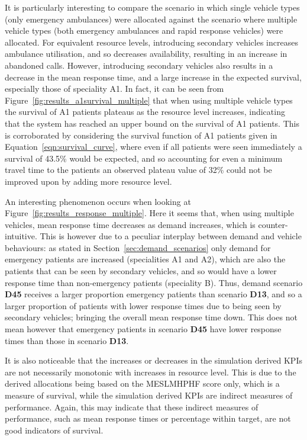 \documentclass[numbers,webpdf,imaman]{ima-authoring-template}%
\begin{document}
It is particularly interesting to compare the scenario in which single vehicle
types (only emergency ambulances) were allocated against the scenario where
multiple vehicle types (both emergency ambulances and rapid response vehicles)
were allocated. For equivalent resource levels, introducing secondary vehicles
increases ambulance utilisation, and so decreases availability, resulting in
an increase in abandoned calls. However, introducing secondary vehicles also
results in a decrease in the mean response time, and a large increase in the
expected survival, especially those of speciality A1.
In fact, it can be seen from Figure~\ref{fig:results_a1survival_multiple} that when using multiple vehicle types the survival of 
A1 patients plateaus as the resource level increases, indicating that the system has reached an upper bound on the survival of A1 patients. 
This is corroborated by considering the survival function of A1 patients given in Equation~\ref{eqn:survival_curve}, where even if all 
patients were seen immediately a survival of 43.5\% would be expected, and so accounting for even a minimum travel time to the patients an 
observed plateau value of 32\% could not be improved upon by adding more resource level.

An interesting phenomenon occurs when looking at
Figure~\ref{fig:results_response_multiple}. Here it seems that, when using
multiple vehicles, mean response time decreases as demand increases, which is
counter-intuitive. This is however due to a peculiar interplay between demand
and vehicle behaviours: as stated in
Section~\ref{sec:demand_scenarios} only demand for emergency patients are
increased (specialities A1 and A2), which are also the patients that can be seen
by secondary vehicles, and so would have a lower response time than
non-emergency patients (speciality B). Thus, demand scenario \textbf{D45}
receives a larger proportion emergency patients than scenario \textbf{D13}, and
so a larger proportion of patients with lower response times due to being seen
by secondary vehicles; bringing the overall mean response time down. This does
not mean however that emergency patients in scenario \textbf{D45} have lower
response times than those in scenario \textbf{D13}.

It is also noticeable that the increases or decreases in the simulation
derived KPIs are not necessarily monotonic with increases in resource level.
This is due to the derived allocations being based on the MESLMHPHF score
only, which is a measure of survival, while the simulation derived KPIs are
indirect measures of performance. Again, this may indicate that these indirect
measures of performance, such as mean response times or percentage within
target, are not good indicators of survival.
\end{document}
